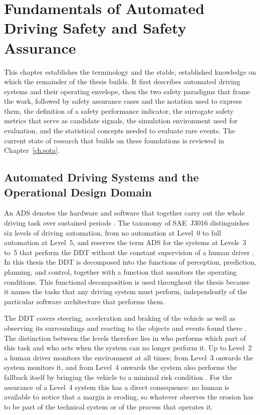 \chapter[Fundamentals]{Fundamentals of Automated Driving Safety and Safety Assurance}
\label{ch:fundamentals}

This chapter establishes the terminology and the stable, established knowledge on
which the remainder of the thesis builds. It first describes automated driving
systems and their operating envelope, then the two safety paradigms that frame the
work, followed by safety assurance cases and the notation used to express them, the
definition of a safety performance indicator, the surrogate safety metrics that serve
as candidate signals, the simulation environment used for evaluation, and the
statistical concepts needed to evaluate rare events. The current state of research
that builds on these foundations is reviewed in Chapter~\ref{ch:sota}.

\section{Automated Driving Systems and the Operational Design Domain}
\label{sec:fund_ads}

An \ac{ADS} denotes the hardware and software that together carry out the whole
driving task over sustained periods \cite{saej3016}. The taxonomy of SAE~J3016 distinguishes
six levels of driving automation, from no automation at Level~0 to full automation at
Level~5, and reserves the term \ac{ADS} for the systems at Levels~3 to~5 that perform
the \ac{DDT} without the constant supervision of a human driver
\cite{saej3016}. In this thesis the \ac{DDT} is decomposed into the functions of
perception, prediction, planning, and control, together with a function that monitors
the operating conditions. This functional decomposition is used throughout the thesis
because it names the tasks that any driving system must perform, independently of the
particular software architecture that performs them.

The \ac{DDT} covers steering, acceleration and braking of the vehicle as well as
observing its surroundings and reacting to the objects and events found there
\cite{saej3016}. The distinction between the levels therefore
lies in who performs which part of this task and who acts when the system can no
longer perform it. Up to Level~2 a human driver monitors the environment at all times;
from Level~3 onwards the system monitors it, and from Level~4 onwards the system also
performs the fallback itself by bringing the vehicle to a minimal risk condition
\cite{saej3016}. For the assurance of a Level~4 system this has a direct consequence:
no human is available to notice that a margin is eroding, so whatever observes the
erosion has to be part of the technical system or of the process that operates it.

